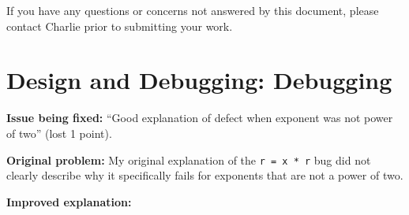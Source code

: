 \documentclass{exam}
\begin{document}
If you have any questions or concerns not answered by this document, please contact Charlie prior to submitting your work.

\section*{Design and Debugging: Debugging}

\textbf{Issue being fixed:} ``Good explanation of defect when exponent was not power of two'' (lost 1 point).

\textbf{Original problem:} My original explanation of the \verb|r = x * r| bug did not clearly describe why it specifically fails for exponents that are not a power of two.

\textbf{Improved explanation:}
\end{document}
